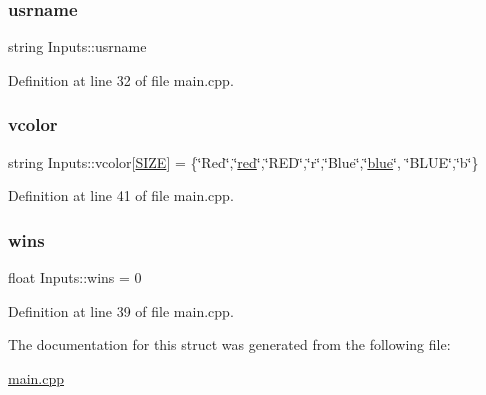 \subsubsection{\texorpdfstring{usrname}{usrname}}
{\footnotesize\ttfamily string Inputs\+::usrname}



Definition at line 32 of file main.\+cpp.

\mbox{\label{struct_inputs_a80018d9bf94a9c6ea573b93ed30f89a6}} 
\subsubsection{\texorpdfstring{vcolor}{vcolor}}
{\footnotesize\ttfamily string Inputs\+::vcolor\mbox{[}\hyperlink{main_8cpp_af08413a3ee12cf78b0ddeea71e2648b3}{S\+I\+ZE}\mbox{]} = \{\char`\"{}Red\char`\"{},\char`\"{}\hyperlink{struct_inputs_a7e6f084b57b2515a6d260d422b252f37}{red}\char`\"{},\char`\"{}R\+ED\char`\"{},\char`\"{}r\char`\"{},\char`\"{}Blue\char`\"{},\char`\"{}\hyperlink{struct_inputs_a685a6f5b41c965ecc2ff5ede529649da}{blue}\char`\"{}, \char`\"{}B\+L\+UE\char`\"{},\char`\"{}b\char`\"{}\}}



Definition at line 41 of file main.\+cpp.

\mbox{\label{struct_inputs_a29b8137642d1269f9ef32b785200c17c}} 
\subsubsection{\texorpdfstring{wins}{wins}}
{\footnotesize\ttfamily float Inputs\+::wins = 0}



Definition at line 39 of file main.\+cpp.



The documentation for this struct was generated from the following file\+:\begin{DoxyCompactItemize}
\item 
\hyperlink{main_8cpp}{main.\+cpp}\end{DoxyCompactItemize}
